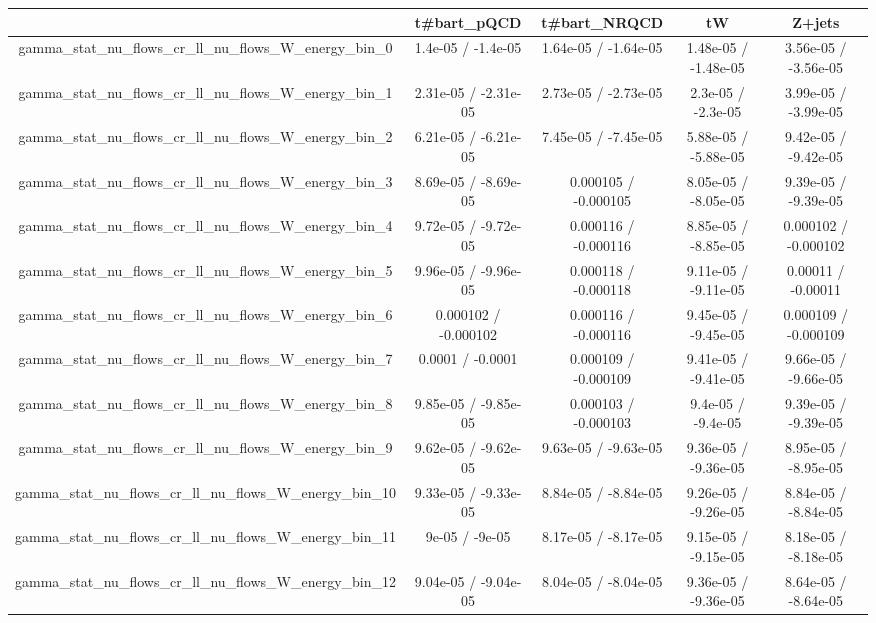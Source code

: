 \documentclass[10pt]{article}
\begin{document}
\begin{table}[htbp]
\begin{center}
\begin{tabular}{|c|c|c|c|c|}
\hline 
      & t#bar{t}_{pQCD}      & t#bar{t}_{NRQCD}      & tW      & Z+jets \\ 
\hline 
  gamma_stat_nu_flows_cr_ll_nu_flows_W_energy_bin_0 & 1.4e-05 / -1.4e-05 & 1.64e-05 / -1.64e-05 & 1.48e-05 / -1.48e-05 & 3.56e-05 / -3.56e-05 \\ 
  gamma_stat_nu_flows_cr_ll_nu_flows_W_energy_bin_1 & 2.31e-05 / -2.31e-05 & 2.73e-05 / -2.73e-05 & 2.3e-05 / -2.3e-05 & 3.99e-05 / -3.99e-05 \\ 
  gamma_stat_nu_flows_cr_ll_nu_flows_W_energy_bin_2 & 6.21e-05 / -6.21e-05 & 7.45e-05 / -7.45e-05 & 5.88e-05 / -5.88e-05 & 9.42e-05 / -9.42e-05 \\ 
  gamma_stat_nu_flows_cr_ll_nu_flows_W_energy_bin_3 & 8.69e-05 / -8.69e-05 & 0.000105 / -0.000105 & 8.05e-05 / -8.05e-05 & 9.39e-05 / -9.39e-05 \\ 
  gamma_stat_nu_flows_cr_ll_nu_flows_W_energy_bin_4 & 9.72e-05 / -9.72e-05 & 0.000116 / -0.000116 & 8.85e-05 / -8.85e-05 & 0.000102 / -0.000102 \\ 
  gamma_stat_nu_flows_cr_ll_nu_flows_W_energy_bin_5 & 9.96e-05 / -9.96e-05 & 0.000118 / -0.000118 & 9.11e-05 / -9.11e-05 & 0.00011 / -0.00011 \\ 
  gamma_stat_nu_flows_cr_ll_nu_flows_W_energy_bin_6 & 0.000102 / -0.000102 & 0.000116 / -0.000116 & 9.45e-05 / -9.45e-05 & 0.000109 / -0.000109 \\ 
  gamma_stat_nu_flows_cr_ll_nu_flows_W_energy_bin_7 & 0.0001 / -0.0001 & 0.000109 / -0.000109 & 9.41e-05 / -9.41e-05 & 9.66e-05 / -9.66e-05 \\ 
  gamma_stat_nu_flows_cr_ll_nu_flows_W_energy_bin_8 & 9.85e-05 / -9.85e-05 & 0.000103 / -0.000103 & 9.4e-05 / -9.4e-05 & 9.39e-05 / -9.39e-05 \\ 
  gamma_stat_nu_flows_cr_ll_nu_flows_W_energy_bin_9 & 9.62e-05 / -9.62e-05 & 9.63e-05 / -9.63e-05 & 9.36e-05 / -9.36e-05 & 8.95e-05 / -8.95e-05 \\ 
  gamma_stat_nu_flows_cr_ll_nu_flows_W_energy_bin_10 & 9.33e-05 / -9.33e-05 & 8.84e-05 / -8.84e-05 & 9.26e-05 / -9.26e-05 & 8.84e-05 / -8.84e-05 \\ 
  gamma_stat_nu_flows_cr_ll_nu_flows_W_energy_bin_11 & 9e-05 / -9e-05 & 8.17e-05 / -8.17e-05 & 9.15e-05 / -9.15e-05 & 8.18e-05 / -8.18e-05 \\ 
  gamma_stat_nu_flows_cr_ll_nu_flows_W_energy_bin_12 & 9.04e-05 / -9.04e-05 & 8.04e-05 / -8.04e-05 & 9.36e-05 / -9.36e-05 & 8.64e-05 / -8.64e-05 \\ 

\end{tabular}
\end{center}
\end{table}
\end{document}
